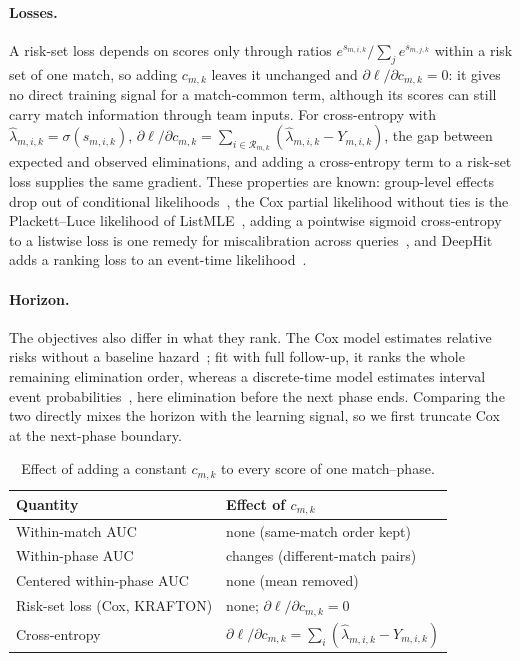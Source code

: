 \documentclass[sigconf,anonymous,nonacm]{acmart}
\begin{document}
\paragraph{Losses.}
A risk-set loss depends on scores only through ratios $e^{s_{m,i,k}}/\sum_{j}e^{s_{m,j,k}}$ within a risk set of one match, so adding $c_{m,k}$ leaves it unchanged and $\partial\ell/\partial c_{m,k}=0$: it gives no direct training signal for a match-common term, although its scores can still carry match information through team inputs. For cross-entropy with $\hat\lambda_{m,i,k}=\sigma(s_{m,i,k})$, $\partial\ell/\partial c_{m,k}=\sum_{i\in\mathcal{R}_{m,k}}(\hat\lambda_{m,i,k}-Y_{m,i,k})$, the gap between expected and observed eliminations, and adding a cross-entropy term to a risk-set loss supplies the same gradient. These properties are known: group-level effects drop out of conditional likelihoods~\cite{Chamberlain80}, the Cox partial likelihood without ties is the Plackett--Luce likelihood of ListMLE~\cite{Xia08}, adding a pointwise sigmoid cross-entropy to a listwise loss is one remedy for miscalibration across queries~\cite{Bai23}, and DeepHit adds a ranking loss to an event-time likelihood~\cite{DeepHit18,DynamicDeepHit20}.

\paragraph{Horizon.}
The objectives also differ in what they rank. The Cox model estimates relative risks without a baseline hazard~\cite{Cox72}; fit with full follow-up, it ranks the whole remaining elimination order, whereas a discrete-time model estimates interval event probabilities~\cite{SingerWillett93,Gensheimer19}, here elimination before the next phase ends. Comparing the two directly mixes the horizon with the learning signal, so we first truncate Cox at the next-phase boundary.

\begin{table}[t]
\centering\footnotesize
\caption{Effect of adding a constant $c_{m,k}$ to every score of one match--phase.}
\label{tab:account}
\setlength{\tabcolsep}{3pt}
\begin{tabular}{ll}
\toprule
Quantity & Effect of $c_{m,k}$ \\
\midrule
Within-match AUC & none (same-match order kept) \\
Within-phase AUC & changes (different-match pairs) \\
Centered within-phase AUC & none (mean removed) \\
Risk-set loss (Cox, KRAFTON) & none; $\partial\ell/\partial c_{m,k}=0$ \\
Cross-entropy & $\partial\ell/\partial c_{m,k}=\sum_{i}(\hat\lambda_{m,i,k}-Y_{m,i,k})$ \\
\bottomrule
\end{tabular}
\end{table}
\end{document}
